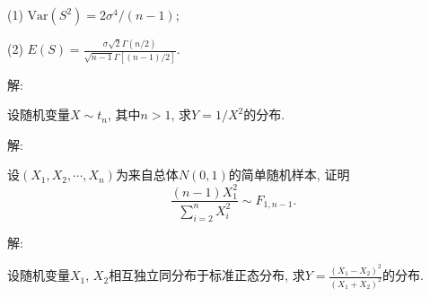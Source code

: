 \documentclass[standard]{ExBook}
\begin{document}
\begin{qitems}
\begin{bbox}
\begin{shaded}
(1) $\text{Var}(S^2) = 2\sigma^4 \big/ (n-1)$;

(2) $E(S)=\displaystyle\frac{\sigma\sqrt{2}\Gamma(n/2)}{\sqrt{n-1}\Gamma\left[(n-1)/2\right]}$.
    \end{shaded}
    \end{bbox}

\vspace{-5em}

    \begin{bbox}
解: 
    \end{bbox}

\vspace{-5em}

    \begin{bbox}
    \begin{shaded}
        \qitem
设随机变量$X\sim t_n$, 其中$n>1$, 求$Y=1/X^2$的分布.
    \end{shaded}
    \end{bbox}

\vspace{-5em}

    \begin{bbox}
解: 
    \end{bbox}

\vspace{-5em}

    \begin{bbox}
    \begin{shaded}
        \qitem
设$(X_1,X_2,\cdots,X_n)$为来自总体$N(0,1)$的简单随机样本, 证明
$$\displaystyle\frac{(n-1)X_{1}^{2}}{\displaystyle\sum\limits_{i=2}^{n}X_{i}^{2}} \sim F_{1,n-1}.$$
    \end{shaded}
    \end{bbox}

\vspace{-5em}

    \begin{bbox}
解: 
    \end{bbox}

\vspace{-5em}

    \begin{bbox}
    \begin{shaded}
        \qitem
设随机变量$X_1$, $X_2$相互独立同分布于标准正态分布, 求$Y = \displaystyle\frac{(X_1-X_2)^2}{(X_1+X_2)^2}$的分布.
    \end{shaded}
    \end{bbox}

\vspace{-5em}


\end{qitems}
\end{document}
